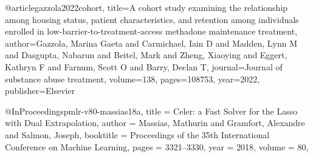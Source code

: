@article{gazzola2022cohort,
  title={A cohort study examining the relationship among housing status, patient characteristics, and retention among individuals enrolled in low-barrier-to-treatment-access methadone maintenance treatment},
  author={Gazzola, Marina Gaeta and Carmichael, Iain D and Madden, Lynn M and Dasgupta, Nabarun and Beitel, Mark and Zheng, Xiaoying and Eggert, Kathryn F and Farnum, Scott O and Barry, Declan T},
  journal={Journal of substance abuse treatment},
  volume={138},
  pages={108753},
  year={2022},
  publisher={Elsevier}
}

@InProceedings{pmlr-v80-massias18a,
  title     = {Celer: a Fast Solver for the Lasso with Dual Extrapolation},
  author    = {Massias, Mathurin and Gramfort, Alexandre and Salmon, Joseph},
  booktitle = {Proceedings of the 35th International Conference on Machine Learning},
  pages     = {3321--3330},
  year      = {2018},
  volume    = {80},
}